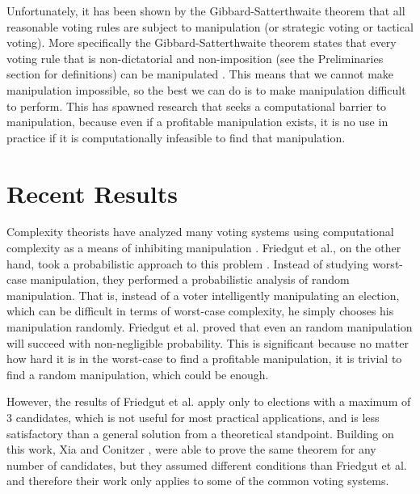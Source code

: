 	Unfortunately, it has been shown by the Gibbard-Satterthwaite theorem that all reasonable voting rules are subject to manipulation (or strategic voting or tactical voting). More specifically the Gibbard-Satterthwaite theorem states that every voting rule that is non-dictatorial and non-imposition (see the Preliminaries section for definitions) can be manipulated \cite{gibbard1973manipulation, satterthwaite1975strategy, duggan2000strategic}. This means that we cannot make manipulation impossible, so the best we can do is to make manipulation difficult to perform. This has spawned research that seeks a computational barrier to manipulation, because even if a profitable manipulation exists, it is no use in practice if it is computationally infeasible to find that manipulation.


\section{Recent Results}

	Complexity theorists have analyzed many voting systems using computational complexity as a means of inhibiting manipulation \cite{bartholdi1989computational, hemaspaandra2009hybrid}. Friedgut et al., on the other hand, took a probabilistic approach to this problem \cite{friedgut2008elections}. Instead of studying worst-case manipulation, they performed a probabilistic analysis of random manipulation. That is, instead of a voter intelligently manipulating an election, which can be difficult in terms of worst-case complexity, he simply chooses his manipulation randomly. Friedgut et al. \cite{friedgut2008elections} proved that even an random manipulation will succeed with non-negligible probability. This is significant because no matter how hard it is in the worst-case to find a profitable manipulation, it is trivial to find a random manipulation, which could be enough.

	However, the results of Friedgut et al. \cite{friedgut2008elections} apply only to elections with a maximum of 3 candidates, which is not useful for most practical applications, and is less satisfactory than a general solution from a theoretical standpoint. Building on this work, Xia and Conitzer \cite{xia2008sufficient}, were able to prove the same theorem for any number of candidates, but they assumed different conditions than Friedgut et al. and therefore their work only applies to some of the common voting systems.
